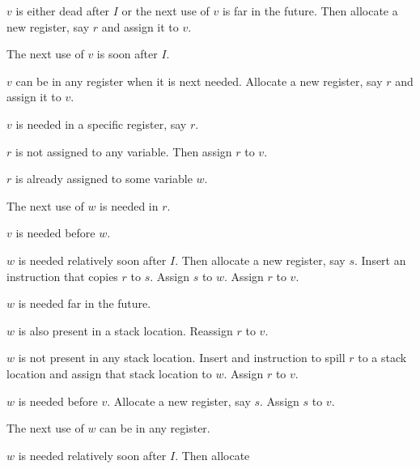 \begin{legal}
\item $v$ is either dead after $I$ or the next use of $v$ is far in
  the future.  Then allocate a new register, say $r$ and assign it to
  $v$.
\item The next use of $v$ is soon after $I$.
  \begin{legal}
  \item $v$ can be in any register when it is next needed.  Allocate a
    new register, say $r$ and assign it to $v$.
  \item $v$ is needed in a specific register, say $r$.
    \begin{legal}
    \item $r$ is not assigned to any variable.  Then assign $r$ to
      $v$.
    \item $r$ is already assigned to some variable $w$.
      \begin{legal}
      \item The next use of $w$ is needed in $r$.
        \begin{legal}
        \item $v$ is needed before $w$.
          \begin{legal}
          \item $w$ is needed relatively soon after $I$.  Then
            allocate a new register, say $s$.  Insert an instruction
            that copies $r$ to $s$.  Assign $s$ to $w$.  Assign $r$ to
            $v$.
          \item $w$ is needed far in the future.
            \begin{legal}
            \item $w$ is also present in a stack location.  Reassign
              $r$ to $v$.
            \item $w$ is not present in any stack location.  Insert
              and instruction to spill $r$ to a stack location and
              assign that stack location to $w$.  Assign $r$ to $v$.
            \end{legal}
          \end{legal}
        \item $w$ is needed before $v$.  Allocate a new register, say
          $s$.  Assign $s$ to $v$.
        \end{legal}
      \item The next use of $w$ can be in any register.
        \begin{legal}
        \item $w$ is needed relatively soon after $I$.  Then allocate

\end{legal}
\end{legal}
\end{legal}
\end{legal}
\end{legal}
